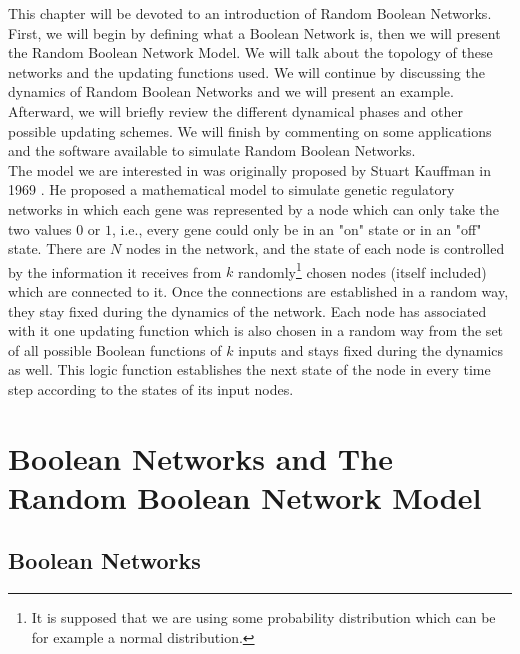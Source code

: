 \label{boolean_chapter}
\newtheorem{theorem}{Theorem}[chapter]


This chapter will be devoted to an introduction of Random Boolean Networks. First, we will begin by defining what a Boolean Network is, then we will present the Random Boolean Network Model. We will talk about the topology of these networks and the updating functions used. We will continue by discussing the dynamics of Random Boolean Networks and we will present an example. Afterward, we will briefly review the different dynamical phases and other possible updating schemes. We will finish by commenting on some applications and the software available to simulate Random Boolean Networks.\\

The model we are interested in was originally proposed by Stuart Kauffman in 1969 \cite{kauffman1} \cite{kauffman2}. He proposed a mathematical model to simulate genetic regulatory networks in which each gene was represented by a node which can only take the two values $0$ or $1$, i.e., every gene could only be in an "on" state or in an "off" state. There are $N$ nodes in the network, and the state of each node is controlled by the information it receives from $k$ randomly\footnote{It is supposed that we are using some probability distribution which can be for example a normal distribution.} chosen nodes (itself included) which are connected to it. Once the connections are established in a random way, they stay fixed during the dynamics of the network. Each node has associated with it one updating function which is also chosen in a random way from the set of all possible Boolean functions of $k$ inputs and stays fixed during the dynamics as well. This logic function establishes the next state of the node in every time step according to the states of its input nodes. 

\section{Boolean Networks and The Random Boolean Network Model}
\subsection{Boolean Networks}

